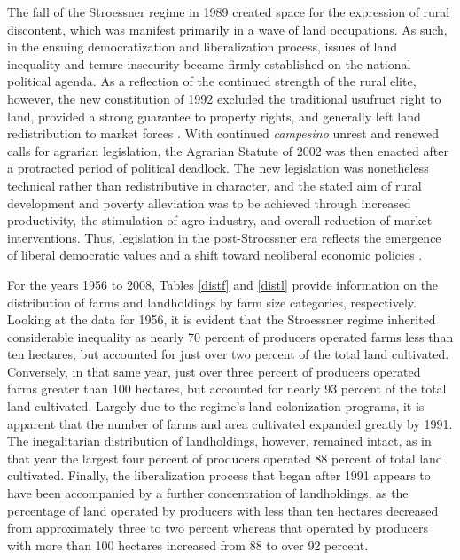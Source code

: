 \documentclass[english]{article}
\begin{document}
The fall of the Stroessner regime in 1989 created space for the expression of 
rural discontent, which was manifest primarily in a wave of land occupations.
As such, in the ensuing democratization and liberalization process, issues of  
land inequality and tenure insecurity became firmly established on the national 
political agenda.
As a reflection of the continued strength of the rural elite, however, the new 
constitution of 1992 excluded the traditional usufruct right to land, provided a 
strong guarantee to property rights, and generally left land redistribution to 
market forces \citep{nagel1999, danielsen2009}.
With continued \emph{campesino} unrest and renewed calls for agrarian 
legislation, the Agrarian Statute of 2002 was then enacted after a protracted 
period of political deadlock.
The new legislation was nonetheless technical rather than redistributive in 
character, and the stated aim of rural development and poverty alleviation 
was to be achieved through increased productivity, the stimulation of
agro-industry, and overall reduction of market interventions.
Thus, legislation in the post-Stroessner era reflects the emergence of liberal 
democratic values and a shift toward neoliberal economic policies
\citep{danielsen2009}. 

For the years 1956 to 2008, Tables \ref{distf} and \ref{distl} provide 
information on the distribution of farms and landholdings by farm size 
categories, respectively. 
Looking at the data for 1956, it is evident that the Stroessner regime 
inherited considerable inequality as nearly 70 percent of producers 
operated farms less than ten hectares, but accounted for just over two 
percent of the total land cultivated.
Conversely, in that same year, just over three percent of producers operated
farms greater than 100 hectares, but accounted for nearly 93 percent
of the total land cultivated.
Largely due to the regime's land colonization programs, it is apparent that 
the number of farms and area cultivated expanded greatly by 1991. 
The inegalitarian distribution of landholdings, however, remained intact, as in 
that year the largest four percent of producers operated 88 percent of total 
land cultivated.
Finally, the liberalization process that began after 1991 appears to have been
accompanied by a further concentration of landholdings, as the percentage of 
land operated by producers with less than ten hectares decreased from 
approximately three to two percent whereas that operated by producers with 
more than 100 hectares increased from 88 to over 92 percent.
\end{document}
